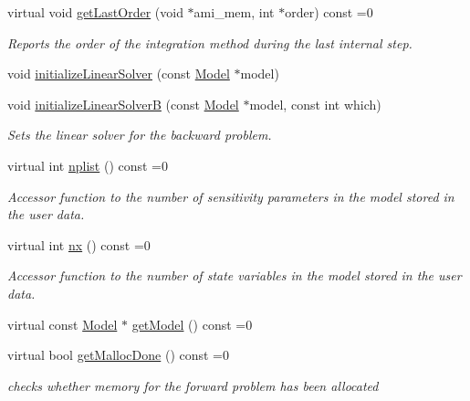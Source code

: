 \begin{DoxyCompactItemize}
virtual void \mbox{\hyperlink{classamici_1_1_solver_a491a5e0ffd6c1678a8bb5313df88ab45}{get\+Last\+Order}} (void $\ast$ami\+\_\+mem, int $\ast$order) const =0
\begin{DoxyCompactList}\small\item\em Reports the order of the integration method during the last internal step. \end{DoxyCompactList}\item 
void \mbox{\hyperlink{classamici_1_1_solver_a6f41389f3a02d0b1ed9bfebcc080d3e1}{initialize\+Linear\+Solver}} (const \mbox{\hyperlink{classamici_1_1_model}{Model}} $\ast$model)
\item 
void \mbox{\hyperlink{classamici_1_1_solver_a4f596731d15be6e9e76a2147aa1cce34}{initialize\+Linear\+SolverB}} (const \mbox{\hyperlink{classamici_1_1_model}{Model}} $\ast$model, const int which)
\begin{DoxyCompactList}\small\item\em Sets the linear solver for the backward problem. \end{DoxyCompactList}\item 
virtual int \mbox{\hyperlink{classamici_1_1_solver_a9a135f04f34dbf45cf980b97e6906665}{nplist}} () const =0
\begin{DoxyCompactList}\small\item\em Accessor function to the number of sensitivity parameters in the model stored in the user data. \end{DoxyCompactList}\item 
virtual int \mbox{\hyperlink{classamici_1_1_solver_a86a18c4e461de76881b6af72e4feb8d9}{nx}} () const =0
\begin{DoxyCompactList}\small\item\em Accessor function to the number of state variables in the model stored in the user data. \end{DoxyCompactList}\item 
virtual const \mbox{\hyperlink{classamici_1_1_model}{Model}} $\ast$ \mbox{\hyperlink{classamici_1_1_solver_a3ea583e4e53b188c54f426f1bc652a0f}{get\+Model}} () const =0
\item 
virtual bool \mbox{\hyperlink{classamici_1_1_solver_af4bbf9fea3348d86380be1c059e4b9f5}{get\+Malloc\+Done}} () const =0
\begin{DoxyCompactList}\small\item\em checks whether memory for the forward problem has been allocated \end{DoxyCompactList}\item 

\end{DoxyCompactItemize}

